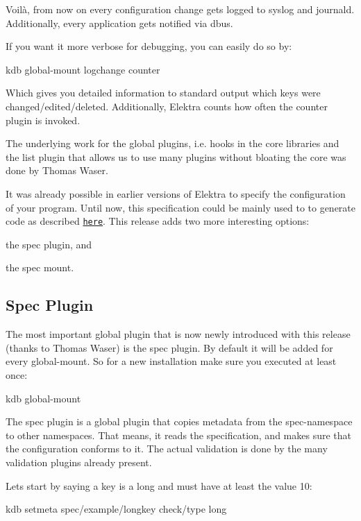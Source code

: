 Voilà, from now on every configuration change gets logged to syslog and journald. Additionally, every application gets notified via dbus.

If you want it more verbose for debugging, you can easily do so by\+: \begin{DoxyVerb}    kdb global-mount logchange counter
\end{DoxyVerb}


Which gives you detailed information to standard output which keys were changed/edited/deleted. Additionally, Elektra counts how often the {\ttfamily counter} plugin is invoked.

The underlying work for the global plugins, i.\+e. hooks in the core libraries and the {\ttfamily list} plugin that allows us to use many plugins without bloating the core was done by Thomas Waser.

It was already possible in earlier versions of Elektra to specify the configuration of your program. Until now, this specification could be mainly used to to generate code as described \href{https://github.com/ElektraInitiative/libelektra/tree/master/src/tools/gen}{\tt here}. This release adds two more interesting options\+:


\begin{DoxyEnumerate}
\item the spec plugin, and
\item the spec mount.
\end{DoxyEnumerate}

\subsection*{Spec Plugin}

The most important global plugin that is now newly introduced with this release (thanks to Thomas Waser) is the {\ttfamily spec} plugin. By default it will be added for every global-\/mount. So for a new installation make sure you executed at least once\+: \begin{DoxyVerb}    kdb global-mount
\end{DoxyVerb}


The spec plugin is a global plugin that copies metadata from the {\ttfamily spec}-\/namespace to other namespaces. That means, it reads the specification, and makes sure that the configuration conforms to it. The actual validation is done by the many validation plugins already present.

Lets start by saying a key is a long and must have at least the value 10\+: \begin{DoxyVerb}    kdb setmeta spec/example/longkey check/type long
\end{DoxyVerb}



